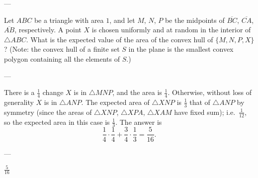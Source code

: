 
---

Let $ABC$ be a triangle with area $1$, and let $M$, $N$, $P$ be the midpoints of $\overline{BC}$, $\overline{CA}$, $\overline{AB}$, respectively. A point $X$ is chosen uniformly and at random in the interior of $\triangle ABC$. What is the expected value of the area of the convex hull of $\{M,N,P,X\}$?
(Note: the convex hull of a finite set $S$ in the plane is the smallest convex polygon containing all the elements of $S$.)

---

There is a $\frac14$ change $X$ is in $\triangle MNP$, and the area is $\frac14$. Otherwise, without loss of generality $X$ is in $\triangle ANP$. The expected area of $\triangle XNP$ is $\frac13$ that of $\triangle ANP$ by symmetry (since the areas of $\triangle XNP$, $\triangle XPA$, $\triangle XAM$ have fixed sum); i.e.\ $\frac1{12}$, so the expected area in this case is $\frac13$. The answer is \[\frac14\cdot\frac14+\frac34\cdot\frac13=\frac5{16}.\]

---

$\frac5{16}$
